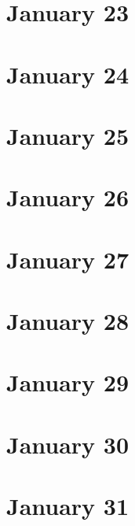 \section{January 23}

\section{January 24}

\section{January 25}

\section{January 26}

\section{January 27}

\section{January 28}

\section{January 29}

\section{January 30}

\section{January 31}

